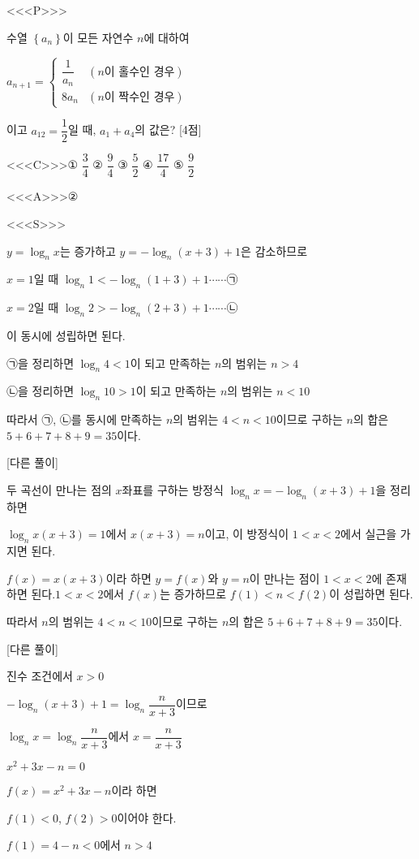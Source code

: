 \documentclass{oblivoir}
\begin{document}
<<<P>>>

수열 $\left\{a_{n}\right\}$이 모든 자연수 $n$에 대하여

$a_{n+1}=\begin{cases}
\dfrac{1}{a_{n}}&(n \text{이 홀수인 경우})\\
8a_{n}&(n \text{이 짝수인 경우})
\end{cases}$

이고 $a_{12}=\dfrac{1}{2}$일 때, $a_{1}+a_{4}$의 값은? [4점]

<<<C>>>① $\dfrac{3}{4}$ ② $\dfrac{9}{4}$ ③ $\dfrac{5}{2}$ ④ $\dfrac{17}{4}$ ⑤ $\dfrac{9}{2}$

<<<A>>>②

<<<S>>>

$y=\log_{n}x$는 증가하고 $y=-\log_{n}(x+3)+1$은 감소하므로

$x=1$일 때 $\log_{n}1 <  -\log_{n}(1+3)+1$$\cdots\cdots$㉠

$x=2$일 때 $\log_{n}2>-\log_{n}(2+3)+1$$\cdots\cdots$㉡

이 동시에 성립하면 된다.

㉠을 정리하면 $\log_{n}4 < 1$이 되고 만족하는 $n$의 범위는 $n> 4$

㉡을 정리하면 $\log_{n}10 > 1$이 되고 만족하는 $n$의 범위는 $n<  10$

따라서 ㉠, ㉡를 동시에 만족하는 $n$의 범위는 $4<  n <  10$이므로 구하는 $n$의 합은 $5+6+7+8+9=35$이다.

[다른 풀이]

두 곡선이 만나는 점의 $x$좌표를 구하는 방정식 $\log_{n}x=-\log_{n}(x+3)+1$을 정리하면

$\log_{n}x(x+3)=1$에서 $x(x+3)=n$이고, 이 방정식이 $1<  x < 2$에서 실근을 가지면 된다.

$f(x)=x(x+3)$이라 하면 $y=f(x)$와 $y=n$이 만나는 점이 $1<  x < 2$에 존재하면 된다.$1<  x < 2$에서 $f(x)$는 증가하므로 $f(1)< n < f(2)$이 성립하면 된다.

따라서 $n$의 범위는 $4<  n <  10$이므로 구하는 $n$의 합은 $5+6+7+8+9=35$이다.

[다른 풀이]

진수 조건에서 $x>0$

$-\log_{n}(x+3)+1=\log_{n}\dfrac{n}{x+3}$이므로

$\log_{n}x=\log_{n}\dfrac{n}{x+3}$에서 $x=\dfrac{n}{x+3}$

$x^{2}+3x-n=0$

$f(x)= x^{2}+3x-n$이라 하면

$f(1)< 0$, $f(2)>0$이어야 한다.

$f(1)=4-n< 0$에서 $n >4$
\end{document}
